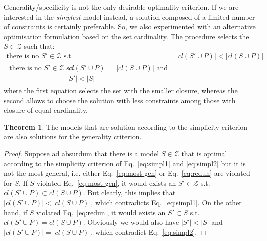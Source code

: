 \documentclass[a4wide,11pt]{article}
\theoremstyle{definition}
\newtheorem{theorem}{Theorem}[section]
\theoremstyle{plain}
\begin{document}
Generality/specificity is not the only desirable optimality criterion. If we are interested in the \emph{simplest} model instead, a solution composed of a limited number of constraints is certainly preferable. So, we also experimented with an alternative optimisation formulation based on the set cardinality. The procedure selects the $S \in\mathcal{Z}$ such that:
\begin{subequations}
   \begin{align}
    \text{there is no } S'\in\mathcal{Z} \text{ s.t. } & |cl(S'\cup P)| < |cl(S\cup P)| \label{eq:simpl1}\\
	\begin{split}
    \text{there is no } S'\in\mathcal{Z} \text{ s.t. } & |cl(S'\cup P)|=|cl(S\cup P)| \text{ and}\\
	&  |S'| < |S| \label{eq:simpl2} 
	\end{split}
   \end{align}
\end{subequations}
where the first equation selects the set with the smaller closure, whereas the second allows to choose the solution with less constraints among those with closure of equal cardinality.%


\theoremstyle{definition}\label{th:subset-generality}
\begin{theorem}{}
The models that are solution according to the simplicity criterion are also solutions for the generality criterion.
\end{theorem} 
\begin{proof}
Suppose ad absurdum that there is a model $S\in\mathcal{Z}$ that is optimal according to the simplicity criterion of Eq.~\eqref{eq:simpl1} and \eqref{eq:simpl2} but it is not the most general, i.e. either Eq.~\eqref{eq:most-gen} or Eq.~\eqref{eq:redun} are violated for $S$. If $S$ violated Eq.~\eqref{eq:most-gen}, it would exists an $S'\in\mathcal{Z}$ s.t. $cl(S'\cup P)\subset cl(S\cup P)$. But clearly, this implies that $|cl(S'\cup P)| < |cl(S\cup P)|$, which contradicts Eq.~\eqref{eq:simpl1}. On the other hand, if $S$ violated Eq.~\eqref{eq:redun}, it would exists an $S' \subset S$ s.t. $cl(S'\cup P)=cl(S\cup P)$. Obviously we would also have $|S'| < |S|$ and $|cl(S'\cup P)|=|cl(S\cup P)|$, which contradict Eq.~\eqref{eq:simpl2}. 
\end{proof}
\end{document}
